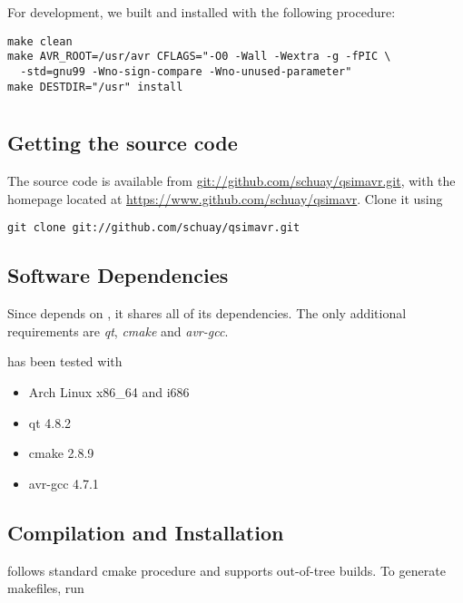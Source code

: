 For development, we built and installed \simavr with the following procedure:

\begin{verbatim}
make clean
make AVR_ROOT=/usr/avr CFLAGS="-O0 -Wall -Wextra -g -fPIC \
  -std=gnu99 -Wno-sign-compare -Wno-unused-parameter"
make DESTDIR="/usr" install
\end{verbatim}

\section{\qsimavr} \label{section:setup_qsimavr}

\subsection{Getting the source code}

The \qsimavr source code is available from
\url{git://github.com/schuay/qsimavr.git}, with the homepage located at
\url{https://www.github.com/schuay/qsimavr}. Clone it using

\begin{verbatim}
git clone git://github.com/schuay/qsimavr.git
\end{verbatim}

\subsection{Software Dependencies}

Since \qsimavr depends on \simavr, it shares all of its dependencies. The only
additional requirements are \emph{qt}, \emph{cmake} and \emph{avr-gcc}.

\qsimavr has been tested with

\begin{itemize}
\item Arch Linux x86\_64 and i686
\item qt 4.8.2
\item cmake 2.8.9
\item avr-gcc 4.7.1
\end{itemize}

\subsection{Compilation and Installation}

\qsimavr follows standard cmake procedure and supports out-of-tree builds. To
generate makefiles, run

